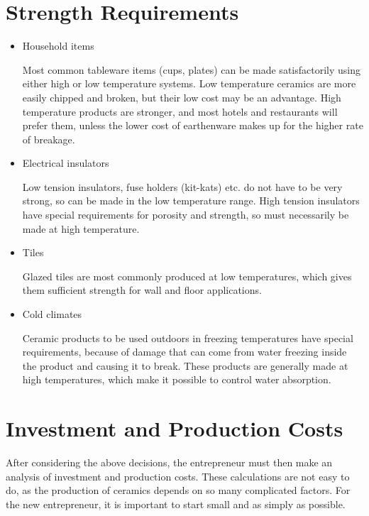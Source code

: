 \section{Strength Requirements}
\begin{itemize}
\item Household items

Most common tableware items (cups, plates) can be made satisfactorily using 
either high or low temperature systems. Low temperature ceramics are more 
easily chipped and broken, but their low cost may be an advantage. High 
temperature products are stronger, and most hotels and restaurants will prefer 
them, unless the lower cost of earthenware makes up for the higher rate of 
breakage.

\item Electrical insulators

Low tension insulators, fuse holders (kit-kats) etc. do not have to be very 
strong, so can be made in the low temperature range. High tension insulators 
have special requirements for porosity and strength, so must necessarily be 
made at high temperature.

\item Tiles

Glazed tiles are most commonly produced at low temperatures, which gives them 
sufficient strength for wall and floor applications.

\item Cold climates

Ceramic products to be used outdoors in freezing temperatures have special 
requirements, because of damage that can come from water freezing inside the 
product and causing it to break. These products are generally made at high 
temperatures, which make it possible to control water absorption.
\end{itemize}
\section{Investment and Production Costs}
After considering the above decisions, the entrepreneur must then make an 
analysis of investment and production costs. These calculations are not easy to 
do, as the production of ceramics depends on so many complicated factors. For 
the new entrepreneur, it is important to start small and as simply as possible.

